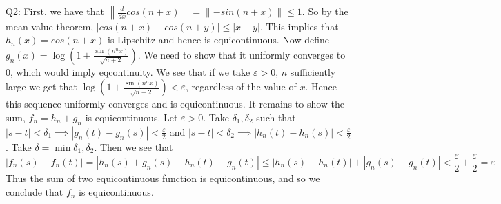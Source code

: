 \documentclass[letterpaper]{article}
\newcommand{\norm}[1]{\left\lVert#1\right\rVert}
\begin{document}
\noindent Q2: First, we have that $\norm{\frac{d}{dx}cos(n+x)} = \norm{-sin(n+x)} \leq 1$. So by the mean value theorem, $|cos(n+x)-cos(n+y)|\leq |x-y|$. This implies that $h_n(x)=cos(n+x)$ is Lipschitz and hence is equicontinuous. 
Now define $g_n(x) = \log(1+\frac{\sin(n^nx)}{\sqrt{n+2}})$. We need to show that it uniformly converges to 0, which would imply eqcontinuity. We see that if we take $\varepsilon>0$, $n$ sufficiently large we get that $\log(1+\frac{\sin(n^nx)}{\sqrt{n+2}})<\varepsilon$, regardless of the value of $x$. Hence this sequence uniformly converges and is equicontinuous. It remains to show the sum, $f_n = h_n+g_n$ is equicontinuous. Let $\varepsilon>0$. Take $\delta_1,\delta_2$ such that $|s-t|<\delta_1\implies |g_n(t)-g_n(s)|<\frac{\varepsilon}{2}$ and $|s-t|<\delta_2 \implies |h_n(t)-h_n(s)|<\frac{\varepsilon}{2}$. Take $\delta= \min{\delta_1,\delta_2}$. Then we see that $$|f_n(s)-f_n(t)| = |h_n(s)+g_n(s) - h_n(t) -g_n(t)| \leq |h_n(s)-h_n(t)| + |g_n(s)-g_n(t)| < \frac{\varepsilon}{2} + \frac{\varepsilon}{2} = \varepsilon$$
Thus the sum of two equicontinuous function is equicontinuous, and so we conclude that $f_n$ is equicontinuous. 
\end{document}
